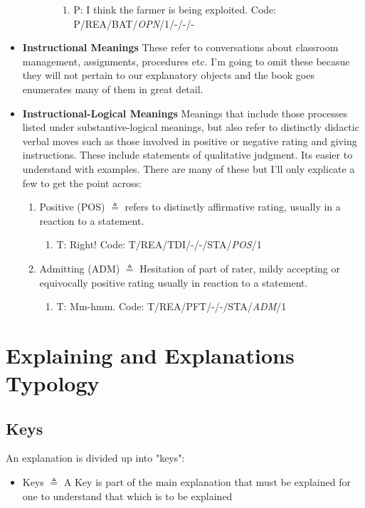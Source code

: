 \documentclass[10pt, letterpaper]{article}
\begin{document}
\begin{itemize}
\begin{itemize}
\begin{enumerate}
\begin{enumerate}
\item P: I think the farmer is being exploited. Code: P/REA/BAT/\textit{OPN}/1/-/-/-
\end{enumerate}
\end{enumerate}
\end{itemize}
\item \textbf{Instructional Meanings}
\label{sec:org79b2c93}
These refer to conversations about classroom management, assignments, procedures etc. I'm going to omit these becasue they will not pertain to our explanatory objects and the book goes enumerates many of them in great detail.
\item \textbf{Instructional-Logical Meanings}
\label{sec:orgb3b580c}
Meanings that include those processes listed under substantive-logical meanings, but also refer to distinctly didactic verbal moves such as those involved in positive or negative rating and giving instructions. These include statements of qualitative judgment. Its easier to understand with examples. There are many of these but I'll only explicate a few to get the point across:
\begin{enumerate}
\item Positive (POS) \(\triangleq\) refers to distinctly affirmative rating, usually in a reaction to a statement.
\begin{enumerate}
\item T: Right! Code: T/REA/TDI/-/-/STA/\textit{POS}/1
\end{enumerate}
\item Admitting (ADM) \(\triangleq\) Hesitation of part of rater, mildy accepting or equivocally positive rating usually in reaction to a statement.
\begin{enumerate}
\item T: Mm-hmm. Code: T/REA/PFT/-/-/STA/\textit{ADM}/1
\end{enumerate}
\end{enumerate}
\end{itemize}
\section*{Explaining and Explanations Typology}
\label{sec:orgefb0efb}

\subsection*{Keys}
\label{sec:orgaee5330}
An explanation is divided up into "keys":
\begin{itemize}
\item Keys \(\triangleq\) A Key is part of the main explanation that must be explained for one to understand that which is to be explained
\end{itemize}
\end{document}
